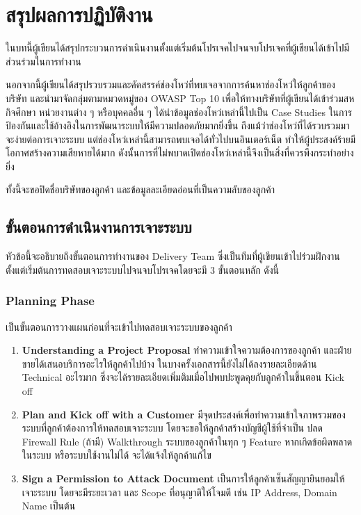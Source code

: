 \chapter{สรุปผลการปฏิบัติงาน}
\label{chapter:experiment}

ในบทนี้ผู้เขียนได้สรุปกระบวนการดำเนินงานตั้งแต่เริ่มต้นโปรเจคไปจนจบโปรเจคที่ผู้เขียนได้เข้าไปมีส่วนร่วมในการทำงาน

นอกจากนี้ผู้เขียนได้สรุปรวบรวมและคัดสรรค์ช่องโหว่ที่พบเจอจากการค้นหาช่องโหว่ให้ลูกค้าของบริษัท และนำมาจัดกลุ่มตามหมวดหมู่ของ OWASP Top 10 เพื่อให้ทางบริษัทที่ผู้เขียนได้เข้าร่วมสหกิจศึกษา หน่วยงานต่าง ๆ  หรือบุคคลอื่น ๆ ได้นำข้อมูลช่องโหว่เหล่านี้ไปเป็น Case Studies ในการป้องกันและใช้อ้างอิงในการพัฒนาระบบให้มีความปลอดภัยมากยิ่งขึ้น ถึงแม้ว่าช่องโหว่ที่ได้รวบรวมมาจะง่ายต่อการเจาะระบบ แต่ช่องโหว่เหล่านี้สามารถพบเจอได้ทั่วไปบนอินเตอร์เน็ต ทำให้ผู้ประสงค์ร้ายมีโอกาศสร้างความเสียหายได้มาก ดังนั้นการที่ไม่พบาดเปิดช่องโหว่เหล่านี้จึงเป็นสิ่งที่ควรพึงกระทำอย่างยิ่ง

ทั้งนี้จะขอปิดชื่อบริษัทของลูกค้า และข้อมูลละเอียดอ่อนที่เป็นความลับของลูกค้า

\section{ขั้นตอนการดำเนินงานการเจาะระบบ}

หัวข้อนี้จะอธิบายถึงขั้นตอนการทำงานของ Delivery Team ซึ่งเป็นทีมที่ผู้เขียนเข้าไปร่วมฝึกงานตั้งแต่เริ่มต้นการทดสอบเจาะระบบไปจนจบโปรเจคโดยจะมี 3 ขั้นตอนหลัก ดังนี้

\subsection{Planning Phase}

เป็นขั้นตอนการวางแผนก่อนที่จะเข้าไปทดสอบเจาะระบบของลูกค้า

\begin{enumerate}
	\itemsep0em 
	\item \textbf{Understanding a Project Proposal} ทำความเข้าใจความต้องการของลูกค้า และฝ่ายขายได้เสนอบริการอะไรให้ลูกค้าไปบ้าง ในบางครั้งเอกสารนี้ยังไม่ได้ลงรายละเอียดด้าน Technical อะไรมาก ซึ่งจะได้รายละเอียดเพิ่มติมเมื่อไปพบปะพูดคุยกับลูกค้าในขึ้นตอน Kick off
	\item \textbf{Plan and Kick off with a Customer} มีจุดประสงค์เพื่อทำความเข้าใจภาพรวมของระบบที่ลูกค้าต้องการให้ทดสอบเจาะระบบ โดยจะขอให้ลูกค้าสร้างบัญชีผู้ใช้ที่จำเป็น ปลด Firewall Rule (ถ้ามี) Walkthrough ระบบของลูกค้าในทุก ๆ Feature หากเกิดข้อผิดพลาดในระบบ หรือระบบใช้งานไม่ได้ จะได้แจ้งให้ลูกค้าแก้ไข
	\item \textbf{Sign a Permission  to Attack Document} เป็นการให้ลูกค้าเซ็นสัญญายินยอมให้เจาะระบบ โดยจะมีระยะเวลา และ Scope ที่อนุญาติให้โจมตี เช่น IP Address, Domain Name เป็นต้น
\end{enumerate}

